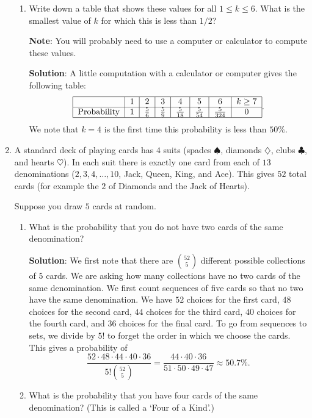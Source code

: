 \documentclass[11pt]{article}
\begin{document}
\begin{enumerate}
\begin{enumerate}
\item Write down a table that shows these values for all $1\le k \le 6$.  What is the smallest value of $k$ for which this is less than $1/2$?

{\bf Note}: You will probably need to use a computer or calculator to compute these values.

{\bf Solution}:  A little computation with a calculator or computer gives the following table:
\[
\begin{tabular}{|c|c|c|c|c|c|c|c|}
\hline
& 1 & 2 & 3 & 4 & 5 & 6 & $k \ge 7$\\
\hline
\text{Probability}& 1 & $\frac{5}{6} $ &$ \frac{5}{9} $ &$\frac{5}{18}$  & $\frac{5}{54}$  &$ \frac{5}{324} $ & 0\\
\hline
\end{tabular}.
\]
We note that $k=4$ is the first time this probability is less than $50\%$.


\end{enumerate}

\item A standard deck of playing cards has $4$ suits (spades $\spadesuit$, diamonds $\diamondsuit$, clubs $\clubsuit$, and hearts $\heartsuit$). In each suit there is exactly one card from each of $13$ denominations ($2,3,4,\ldots, 10$, Jack, Queen, King, and Ace).  This gives $52$ total cards (for example the $2$ of Diamonds and the Jack of Hearts).

Suppose you draw $5$ cards at random.
\begin{enumerate}
\item What is the probability that you do not have two cards of the same denomination?

{\bf Solution}: We first note that there are $\binom{52}{5}$ different possible collections of $5$ cards.  We are asking how many collections have no two cards of the same denomination.  We first count sequences of five cards so that no two have the same denomination.  We have $52$ choices for the first card, $48$ choices for the second card, $44$ choices for the third card, $40$ choices for the fourth card, and $36$ choices for the final card.  To go from sequences to sets, we divide by $5!$ to forget the order in which we choose the cards.  This gives a probability of 
\[
\frac{52\cdot 48\cdot 44\cdot 40\cdot 36}{5! \binom{52}{5}} = \frac{44\cdot 40\cdot 36}{51\cdot 50\cdot 49 \cdot 47} \approx 50.7\%.
\]




\item What is the probability that you have four cards of the same denomination? (This is called a `Four of a Kind'.)


\end{enumerate}
\end{enumerate}
\end{document}
